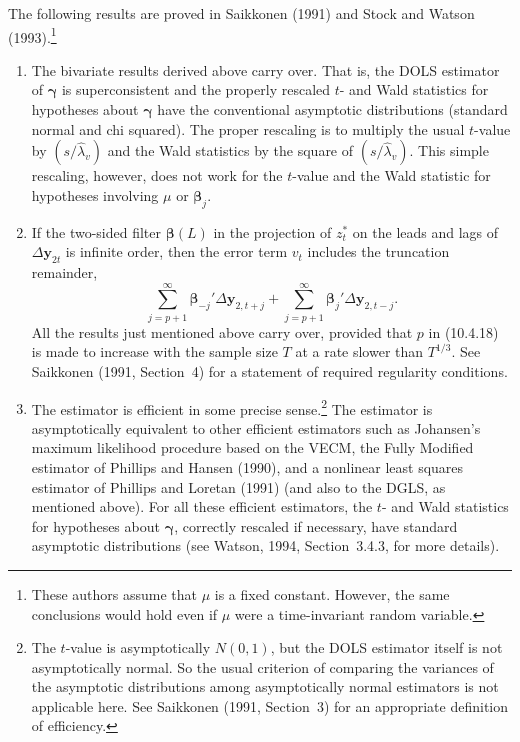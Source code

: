 The following results are proved in Saikkonen (1991) and Stock and Watson
(1993).\footnote{%
These authors assume that $\mu$ is a fixed constant. However, the same conclusions would hold even if $\mu$ were
a time-invariant random variable.}

\begin{enumerate}
\item The bivariate results derived above carry over. That is, the DOLS estimator
  of $\boldsymbol{\gamma}$ is superconsistent and the properly rescaled $t$- and Wald statistics for
  hypotheses about $\boldsymbol{\gamma}$ have the conventional asymptotic distributions (standard
  normal and chi squared). The proper rescaling is to multiply the usual $t$-value
  by $(s/\hat{\lambda}_v)$ and the Wald statistics by the square of $(s/\hat{\lambda}_v)$. This simple rescaling,
  however, does not work for the $t$-value and the Wald statistic for hypotheses in\-volving
  $\mu$ or $\boldsymbol{\beta}_j$.

\item If the two-sided filter $\boldsymbol{\beta}(L)$ in the projection of $z_t^*$ on the leads and lags of
  $\Delta\mathbf{y}_{2t}$
  is infinite order, then the error term $v_t$ includes the truncation remainder,
  \[
    \sum_{j=p+1}^{\infty} \boldsymbol{\beta}_{-j}' \Delta\mathbf{y}_{2,t+j}
    + \sum_{j=p+1}^{\infty} \boldsymbol{\beta}_j' \Delta\mathbf{y}_{2,t-j}.
  \]
  All the results just mentioned above carry over, provided that $p$ in (10.4.18)
  is made to increase with the sample size $T$ at a rate slower than $T^{1/3}$. See
  Saikkonen (1991, Section~4) for a statement of required regularity conditions.

\item The estimator is efficient in some precise sense.\footnote{%
  The $t$-value is asymptotically $N(0, 1)$, but the DOLS estimator itself is not asymptotically normal. So the
  usual criterion of comparing the variances of the asymptotic distributions among asymptotically normal estima\-tors
  is not applicable here. See Saikkonen (1991, Section~3) for an appropriate definition of efficiency.}
  The estimator is asymp\-totically
  equivalent to other efficient estimators such as Johansen's maximum
  likelihood procedure based on the VECM, the Fully Modified estimator of
  Phillips and Hansen (1990), and a nonlinear least squares estimator of Phillips
  and Loretan (1991) (and also to the DGLS, as mentioned above). For all these
  efficient estimators, the $t$- and Wald statistics for hypotheses about $\boldsymbol{\gamma}$, cor\-rectly
  rescaled if necessary, have standard asymptotic distributions (see
  Watson, 1994, Section~3.4.3, for more details).
\end{enumerate}

